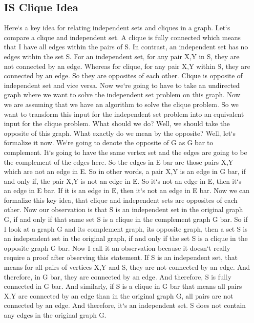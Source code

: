 \subsection{IS Clique Idea}
Here`s a key idea for relating independent sets and cliques in a graph.
Let`s compare a clique and independent set.
A clique is fully connected which means that I have all edges within the pairs of S\@.
In contrast, an independent set has no edges within the set S\@.
For an independent set, for any pair X,Y in S, they are not connected by an edge.
Whereas for clique, for any pair X,Y within S, they are connected by an edge.
So they are opposites of each other.
Clique is opposite of independent set and vice versa.
Now we`re going to have to take an undirected graph where we want to solve the independent set problem on this graph.
Now we are assuming that we have an algorithm to solve the clique problem.
So we want to transform this input for the independent set problem into an equivalent input for the clique problem.
What should we do? Well, we should take the opposite of this graph.
What exactly do we mean by the opposite? Well, let`s formalize it now.
We`re going to denote the opposite of G as G bar to complement.
It`s going to have the same vertex set and the edges are going to be the complement of the edges here.
So the edges in E bar are those pairs X,Y which are not an edge in E\@.
So in other words, a pair X,Y is an edge in G bar, if and only if, the pair X,Y is not an edge in E\@.
So it`s not an edge in E, then it`s an edge in E bar.
If it is an edge in E, then it`s not an edge in E bar.
Now we can formalize this key idea, that clique and independent sets are opposites of each other.
Now our observation is that S is an independent set in the original graph G, if and only if that same set S is a clique in the complement graph G bar.
So if I look at a graph G and its complement graph, its opposite graph, then a set S is an independent set in the original graph, if and only if the set S is a clique in the opposite graph G bar.
Now I call it an observation because it doesn`t really require a proof after observing this statement.
If S is an independent set, that means for all pairs of vertices X,Y and S, they are not connected by an edge.
And therefore, in G bar, they are connected by an edge.
And therefore, S is fully connected in G bar.
And similarly, if S is a clique in G bar that means all pairs X,Y are connected by an edge than in the original graph G, all pairs are not connected by an edge.
And therefore, it`s an independent set.
S does not contain any edges in the original graph G\@.


